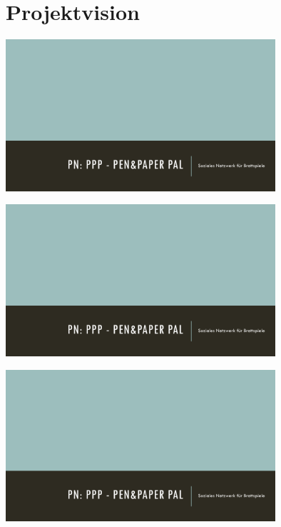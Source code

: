 \documentclass[DIV=13, 10pt,a4paper]{scrartcl} %
\begin{document}
\section{Projektvision}
\thispagestyle{empty}
	\begin{flushleft}
		\includegraphics[page=1,width=0.75\textwidth]{docs/presentation.pdf}
		\vfill
	\end{flushleft}
	\begin{center}
		\includegraphics[page=2,width=0.75\textwidth]{docs/presentation.pdf}
		\vfill
	\end{center}
	\begin{flushright}
		\includegraphics[page=3,width=0.75\textwidth]{docs/presentation.pdf}
	\end{flushright}
	
\end{document}
